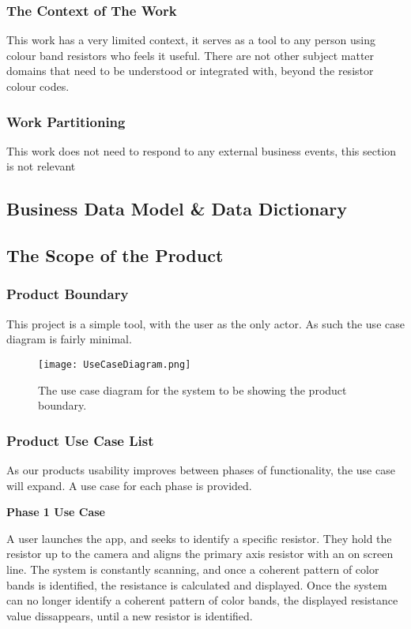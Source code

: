 \documentclass{article}
\begin{document}
\subsubsection{The Context of The Work}

This work has a very limited context, it serves as a tool to any person using colour band resistors who feels it useful.
There are not other subject matter domains that need to be understood or integrated with, beyond the resistor colour codes.

\subsubsection{Work Partitioning}

This work does not need to respond to any external business events, this section is not relevant

\subsection{Business Data Model \& Data Dictionary}

\subsection{The Scope of the Product}

\subsubsection{Product Boundary}
This project is a simple tool, with the user as the only actor.
As such the use case diagram is fairly minimal.

\begin{figure}[h]
    \texttt{[image: UseCaseDiagram.png]}
	\caption{The use case diagram for the system to be showing the product boundary.}
    \label{fig:use_case_diagram}
\end{figure}

\subsubsection{Product Use Case List}

As our products usability improves between phases of functionality, the use case will expand.
A use case for each phase is provided.

\textbf{ Phase 1 Use Case}

A user launches the app, and seeks to identify a specific resistor.
They hold the resistor up to the camera and aligns the primary axis resistor with an on screen line.
The system is constantly scanning, and once a coherent pattern of color bands is identified, the resistance is calculated and displayed.
Once the system can no longer identify a coherent pattern of color bands, the displayed resistance value dissappears, until a new resistor is identified.
\end{document}
